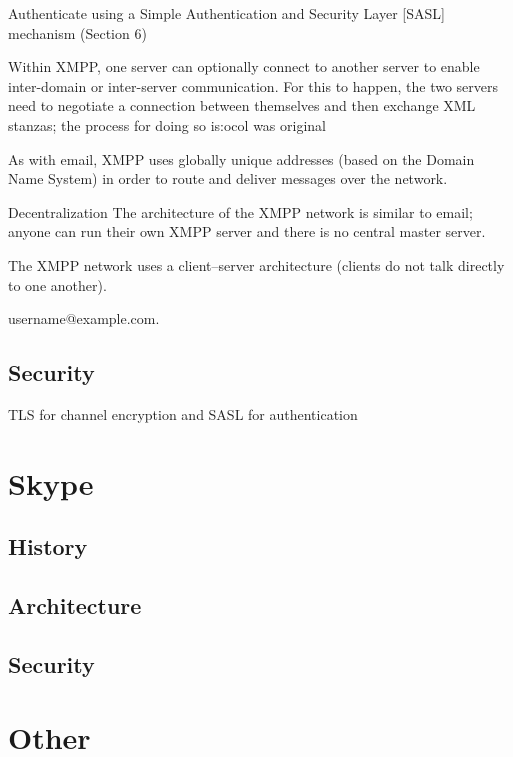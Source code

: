 Authenticate using a Simple Authentication and Security Layer
       [SASL] mechanism (Section 6)


   Within XMPP, one server can optionally connect to another server to
   enable inter-domain or inter-server communication.  For this to
   happen, the two servers need to negotiate a connection between
   themselves and then exchange XML stanzas; the process for doing so
   is:ocol was original

As with email, XMPP uses globally unique addresses (based on the
   Domain Name System) in order to route and deliver messages over the
   network.


Decentralization
The architecture of the XMPP network is similar to email; anyone can run their own XMPP server and there is no central master server.

The XMPP network uses a client–server architecture (clients do not talk directly to one another). 

username@example.com.
\subsection{Security}
TLS for channel encryption and SASL for authentication

\section{Skype}
\subsection{History}
\subsection{Architecture}
\subsection{Security}

\section{Other}

